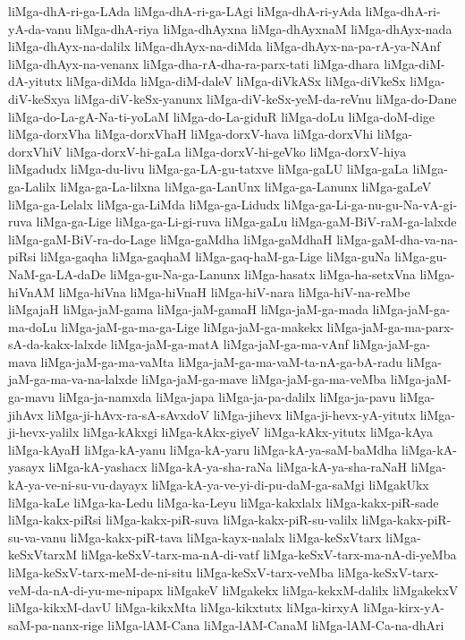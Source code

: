 {liMga-dhA-ri-ga-LAda
liMga-dhA-ri-ga-LAgi
liMga-dhA-ri-yAda
liMga-dhA-ri-yA-da-vanu
liMga-dhA-riya
liMga-dhAyxna
liMga-dhAyxnaM
liMga-dhAyx-nada
liMga-dhAyx-na-dalilx
liMga-dhAyx-na-diMda
liMga-dhAyx-na-pa-rA-ya-NAnf
liMga-dhAyx-na-venanx
liMga-dha-rA-dha-ra-parx-tati
liMga-dhara
liMga-diM-dA-yitutx
liMga-diMda
liMga-diM-daleV
liMga-diVkASx
liMga-diVkeSx
liMga-diV-keSxya
liMga-diV-keSx-yanunx
liMga-diV-keSx-yeM-da-reVnu
liMga-do-Dane
liMga-do-La-gA-Na-ti-yoLaM
liMga-do-La-giduR
liMga-doLu
liMga-doM-dige
liMga-dorxVha
liMga-dorxVhaH
liMga-dorxV-hava
liMga-dorxVhi
liMga-dorxVhiV
liMga-dorxV-hi-gaLa
liMga-dorxV-hi-geVko
liMga-dorxV-hiya
liMgadudx
liMga-du-livu
liMga-ga-LA-gu-tatxve
liMga-gaLU
liMga-gaLa
liMga-ga-Lalilx
liMga-ga-La-lilxna
liMga-ga-LanUnx
liMga-ga-Lanunx
liMga-gaLeV
liMga-ga-Lelalx
liMga-ga-LiMda
liMga-ga-Lidudx
liMga-ga-Li-ga-nu-gu-Na-vA-gi-ruva
liMga-ga-Lige
liMga-ga-Li-gi-ruva
liMga-gaLu
liMga-gaM-BiV-raM-ga-lalxde
liMga-gaM-BiV-ra-do-Lage
liMga-gaMdha
liMga-gaMdhaH
liMga-gaM-dha-va-na-piRsi
liMga-gaqha
liMga-gaqhaM
liMga-gaq-haM-ga-Lige
liMga-guNa
liMga-gu-NaM-ga-LA-daDe
liMga-gu-Na-ga-Lanunx
liMga-hasatx
liMga-ha-setxVna
liMga-hiVnAM
liMga-hiVna
liMga-hiVnaH
liMga-hiV-nara
liMga-hiV-na-reMbe
liMgajaH
liMga-jaM-gama
liMga-jaM-gamaH
liMga-jaM-ga-mada
liMga-jaM-ga-ma-doLu
liMga-jaM-ga-ma-ga-Lige
liMga-jaM-ga-makekx
liMga-jaM-ga-ma-parx-sA-da-kakx-lalxde
liMga-jaM-ga-matA
liMga-jaM-ga-ma-vAnf
liMga-jaM-ga-mava
liMga-jaM-ga-ma-vaMta
liMga-jaM-ga-ma-vaM-ta-nA-ga-bA-radu
liMga-jaM-ga-ma-va-na-lalxde
liMga-jaM-ga-mave
liMga-jaM-ga-ma-veMba
liMga-jaM-ga-mavu
liMga-ja-namxda
liMga-japa
liMga-ja-pa-dalilx
liMga-ja-pavu
liMga-jihAvx
liMga-ji-hAvx-ra-sA-sAvxdoV
liMga-jihevx
liMga-ji-hevx-yA-yitutx
liMga-ji-hevx-yalilx
liMga-kAkxgi
liMga-kAkx-giyeV
liMga-kAkx-yitutx
liMga-kAya
liMga-kAyaH
liMga-kA-yanu
liMga-kA-yaru
liMga-kA-ya-saM-baMdha
liMga-kA-yasayx
liMga-kA-yashacx
liMga-kA-ya-sha-raNa
liMga-kA-ya-sha-raNaH
liMga-kA-ya-ve-ni-su-vu-dayayx
liMga-kA-ya-ve-yi-di-pu-daM-ga-saMgi
liMgakUkx
liMga-kaLe
liMga-ka-Ledu
liMga-ka-Leyu
liMga-kakxlalx
liMga-kakx-piR-sade
liMga-kakx-piRsi
liMga-kakx-piR-suva
liMga-kakx-piR-su-valilx
liMga-kakx-piR-su-va-vanu
liMga-kakx-piR-tava
liMga-kayx-nalalx
liMga-keSxVtarx
liMga-keSxVtarxM
liMga-keSxV-tarx-ma-nA-di-vatf
liMga-keSxV-tarx-ma-nA-di-yeMba
liMga-keSxV-tarx-meM-de-ni-situ
liMga-keSxV-tarx-veMba
liMga-keSxV-tarx-veM-da-nA-di-yu-me-nipapx
liMgakeV
liMgakekx
liMga-kekxM-dalilx
liMgakekxV
liMga-kikxM-davU
liMga-kikxMta
liMga-kikxtutx
liMga-kirxyA
liMga-kirx-yA-saM-pa-nanx-rige
liMga-lAM-Cana
liMga-lAM-CanaM
liMga-lAM-Ca-na-dhAri
}
